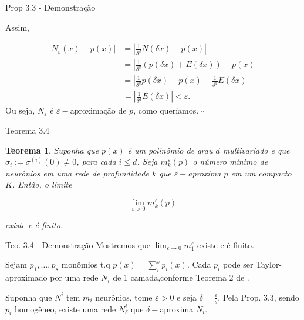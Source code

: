 \documentclass{beamer}
\newtheorem{teo}{Teorema}[section]
\theoremstyle{definition}
\begin{document}
\begin{frame}{Prop 3.3 - Demonstração}

    Assim,

    \begin{align*}
        | N_\varepsilon(x) - p(x) | &= |\frac{1}{\delta^d} N(\delta x) - p(x)| \\
        &= |\frac{1}{\delta^d}(p(\delta x) + E(\delta x))-p(x)| \\
        &=|\frac{1}{\delta^d}p(\delta x) -p(x) + \frac{1}{\delta^d}E(\delta x) |
    \end{align*} \pause
    \begin{align*}
        &= |\frac{1}{\delta^d}E(\delta x)| < \varepsilon.
    \end{align*}
    Ou seja, $N_\varepsilon$ é $\varepsilon-$aproximação de $p$, como queríamos. $\square$
\end{frame}

\begin{frame}{Teorema 3.4}
    \begin{teo}
        Suponha que $p(x)$ é um polinômio de grau $d$ multivariado e que $\sigma_i := \sigma^{(i)}(0) \neq 0$, para cada $i\leq d$. Seja $m_k^\varepsilon(p)$ o número mínimo de neurônios em uma rede de profundidade $k$ que $\varepsilon-$aproxima $p$ em um compacto $K$. \pause 
        \vspace{1em}
        Então, o limite 
        
        \[
        \lim_{\varepsilon>0}m_k^\varepsilon(p)        
        \]
        
        existe e é finito. 
    \end{teo}
\end{frame}

\begin{frame}{Teo. 3.4 - Demonstração}    
    Mostremos que $\lim_{\varepsilon \to 0} m_1^\varepsilon$ existe e é finito. \pause \vspace{1em}

    Sejam $p_1, \dots, p_s$ monômios t.q $p(x) = \sum_i^s p_i(x)$. Cada $p_i$ pode ser Taylor-aproximado por uma rede $N_i$ de 1 camada,conforme Teorema 2 de . 

    \pause
    \vspace{1em}

    Suponha que $N^i$ tem $m_i$ neurônios, tome $\varepsilon>0$ e seja $\delta = \frac{\varepsilon}{s}$. Pela Prop. 3.3, sendo $p_i$ homogêneo, existe uma rede $N^i_\delta$ que $\delta-$aproxima $N_i$.

    \pause
\end{frame}
\end{document}
